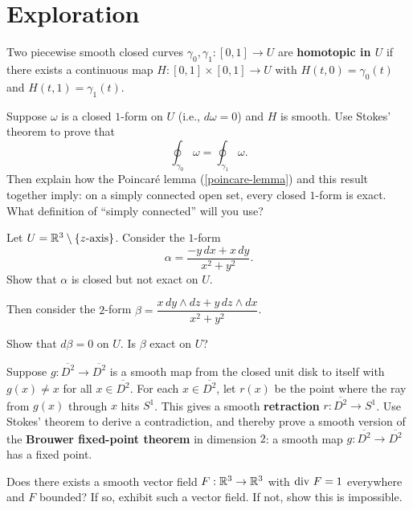 \documentclass{homework}
\begin{document}
\section{Exploration}

\begin{problem}\label{homotopy-invariance}%
  Two piecewise smooth closed curves $\gamma_0, \gamma_1 : [0,1] \to U$ are \textbf{homotopic in $U$} if there exists a continuous map $H:[0,1]\times[0,1]\to U$ with $H(t,0)=\gamma_0(t)$ and $H(t,1)=\gamma_1(t)$.

  Suppose $\omega$ is a closed $1$-form on $U$ (i.e., $d\omega = 0$) and $H$ is smooth.  Use Stokes' theorem to prove that
  \[
    \oint_{\gamma_0}\omega = \oint_{\gamma_1}\omega.
  \]
  Then explain how the Poincar\'e lemma (\ref{poincare-lemma}) and this result together imply:
  on a simply connected open set, every closed $1$-form is exact. What definition of ``simply connected'' will you use?
\end{problem}

\begin{problem}\label{de-rham}%
  Let $U = \mathbb{R}^3 \setminus \{z\text{-axis}\}$.  Consider the $1$-form
  \[
    \alpha = \frac{-y\,dx + x\,dy}{x^2+y^2}.
  \]
  Show that $\alpha$ is closed but not exact on $U$.
  
  Then consider the $2$-form $\beta = \dfrac{x\,dy\wedge dz + y\,dz\wedge dx}{x^2+y^2}$.

  Show that $d\beta = 0$ on $U$.  Is $\beta$ exact on $U$?
\end{problem}

\begin{problem}\label{brouwer}%
  Suppose $g : \overline{D^2} \to \overline{D^2}$ is a smooth map from the closed unit disk to itself with $g(x) \neq x$ for all $x \in \overline{D^2}$.  For each $x \in \overline{D^2}$, let $r(x)$ be the point where the ray from $g(x)$ through $x$ hits $S^1$.  This gives a smooth \textbf{retraction} $r: \overline{D^2} \to S^1$.  Use Stokes' theorem to derive a contradiction, and thereby prove a smooth version of the \textbf{Brouwer fixed-point theorem} in dimension $2$: a smooth map $g:\overline{D^2}\to\overline{D^2}$ has a fixed point.
\end{problem}

\begin{problem}
Does there exists a smooth vector field $F:\mathbb{R}^3\to\mathbb{R}^3$ with $\operatorname{div}\,F = 1$ everywhere and $F$ bounded? If so, exhibit such a vector field. If not, show this is impossible.
\end{problem}
\end{document}
